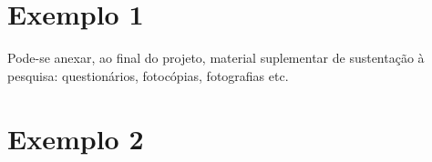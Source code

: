 \documentclass[12pt, oneside, a4paper, chapter=TITLE,section=TITLE]{abntex2}
\begin{document}
\begin{anexosenv} %

\partanexos %

\chapter{Exemplo 1}
Pode-se anexar, ao final do projeto, material suplementar de sustentação à pesquisa: questionários, fotocópias, fotografias etc.


\chapter{Exemplo 2}



\end{anexosenv} %

\printindex
\end{document}
